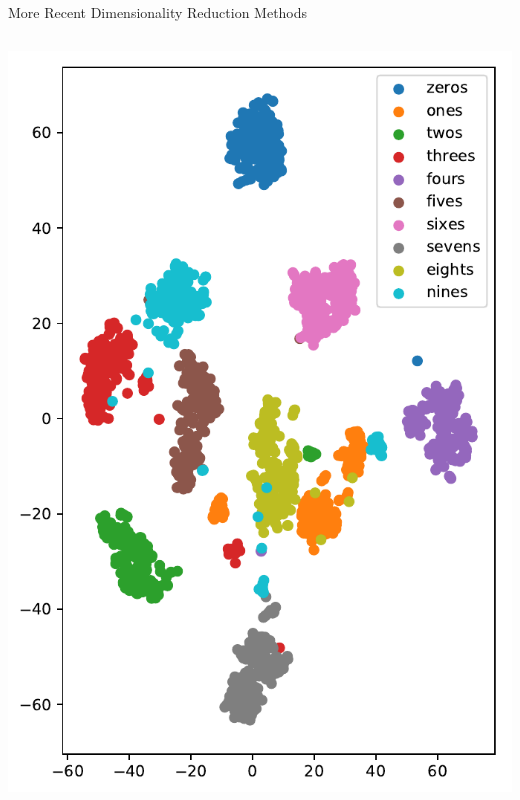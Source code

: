 \documentclass[10pt, aspectratio=169]{beamer} %
\begin{document}
\begin{frame}[fragile, allowframebreaks=0.8]{More Recent Dimensionality Reduction Methods}
\begin{columns}
		\begin{center}
			\includegraphics[width=\columnwidth]{digits_tsne_proj.pdf}
		\end{center}
		\end{columns}
\end{frame}
\end{document}
